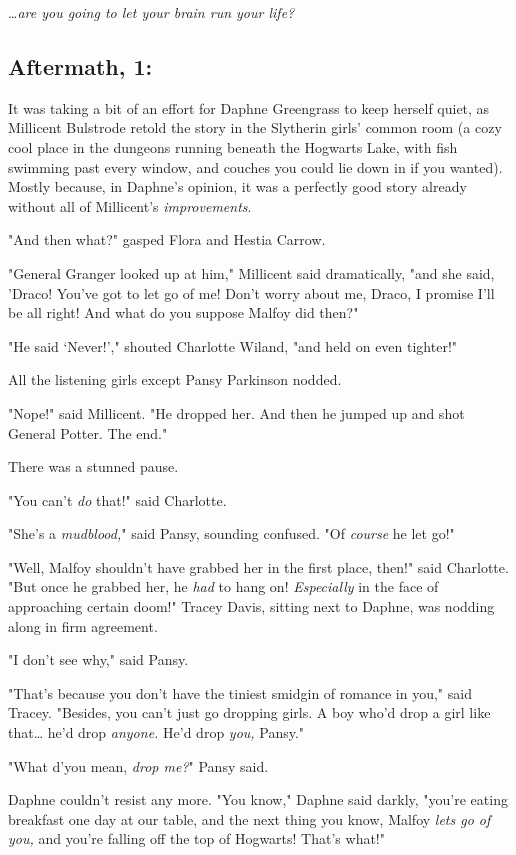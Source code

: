 {\ldots}\emph{are you going to let your brain run your life?}
\sbreak
\vspace{-2\baselineskip}
\subsection{Aftermath, 1:}

It was taking a bit of an effort for Daphne Greengrass to keep herself quiet, 
as Millicent Bulstrode retold the story in the Slytherin girls' common room (a 
cozy cool place in the dungeons running beneath the Hogwarts Lake, with fish 
swimming past every window, and couches you could lie down in if you wanted). 
Mostly because, in Daphne's opinion, it was a perfectly good story already 
without all of Millicent's \emph{improvements}.

"And then what?" gasped Flora and Hestia Carrow.

"General Granger looked up at him," Millicent said dramatically, "and she said, 
'Draco! You've got to let go of me! Don't worry about me, Draco, I promise I'll 
be all right! And what do you suppose Malfoy did then?"

"He said `Never!'," shouted Charlotte Wiland, "and held on even tighter!"

All the listening girls except Pansy Parkinson nodded.

"Nope!" said Millicent. "He dropped her. And then he jumped up and shot General 
Potter. The end."

There was a stunned pause.

"You can't \emph{do} that!" said Charlotte.

"She's a \emph{mudblood,}" said Pansy, sounding confused. "Of \emph{course} he 
let go!"

"Well, Malfoy shouldn't have grabbed her in the first place, then!" said 
Charlotte. "But once he grabbed her, he \emph{had} to hang on! 
\emph{Especially} in the face of approaching certain doom!" Tracey Davis, 
sitting next to Daphne, was nodding along in firm agreement.

"I don't see why," said Pansy.

"That's because you don't have the tiniest smidgin of romance in you," said 
Tracey. "Besides, you can't just go dropping girls. A boy who'd drop a girl 
like that{\ldots} he'd drop \emph{anyone.} He'd drop \emph{you,} Pansy."

"What d'you mean, \emph{drop me?}" Pansy said.

Daphne couldn't resist any more. "You know," Daphne said darkly, "you're eating 
breakfast one day at our table, and the next thing you know, Malfoy \emph{lets 
go of you,} and you're falling off the top of Hogwarts! That's what!"

